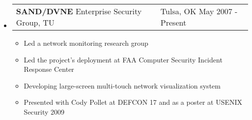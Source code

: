 \documentclass[letterpaper,11pt]{article}
\makeatletter
\newcommand{\resitem}[1]{\item \parbox[t]{4.6in}{#1} \vspace{-2pt}}
\newcommand{\resentry}[3][0pt]{
    \begin{tabular*}{0.9\textwidth}[t]{@{\hspace{#1}}p{5.0in}@{\extracolsep{\fill}}p{0.75in}}
        #2 & #3
        \tabularnewline
    \end{tabular*} %
}
\newcommand{\ressubheading}[4]{
    \resentry{\textbf{#1} \newline #3}{#2 \newline #4}    
}
\makeatother
\begin{document}
\begin{itemize}
\item
	\ressubheading{SAND/DVNE}{Tulsa, OK}{Enterprise Security Group, TU}{May 2007 - Present}
	\begin{itemize}
		\resitem{Led a network monitoring research group}
		\resitem{Led the project's deployment at FAA Computer Security Incident Response Center}
		\resitem{Developing large-screen multi-touch network visualization system}
		\resitem{Presented with Cody Pollet at DEFCON 17 and as a poster at USENIX Security 2009}
	\end{itemize}
\end{itemize}
\end{document}
